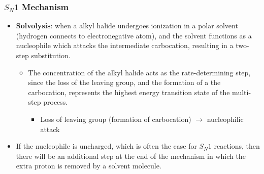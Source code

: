 \documentclass[12pt,a4paper]{article}
\begin{document}
\begin{itemize}
    \subsubsection{\texorpdfstring{\(S_N1\) Mechanism}{Lg}}
    \begin{itemize}
        \item \textbf{Solvolysis}: when a alkyl halide undergoes ionization in a polar solvent (hydrogen connects to electronegative atom), and the solvent functions as a {\color{o-Sun}nucleophile} which attacks the intermediate carbocation, resulting in a two-step substitution.
            \begin{itemize}
                \item The concentration of the {\color{o-Sun}alkyl halide} acts as the {\color{o-Sun}rate-determining} step, since the loss of the leaving group, and the formation of a the carbocation, represents the highest energy transition state of the multi-step process.
                    \begin{itemize}
                        \item Loss of leaving group (formation of carbocation) $\rightarrow$ nucleophilic attack
                    \end{itemize}
            \end{itemize}
        \item If the nucleophile is uncharged, which is often the case for \(S_N1\) reactions, then there will be an additional step at the end of the mechanism in which the extra proton is removed by a solvent molecule.
    \end{itemize}

\end{itemize}
\end{document}
